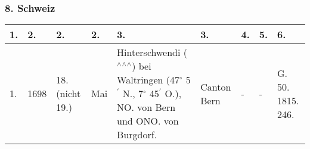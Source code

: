 \documentclass[a4paper, 8pt, oneside, polutonikogreek, german]{article}
\begin{document}
\clearpage
\begin{landscape}
\subsubsection{8. Schweiz}
\begin{table}[!ht]
    \centering
    \begin{tabular}{|l|l|l|l|l|l|l|l|l|}
    \hline
        1. & 2. & 2. & 2. & 3. & 3. & 4. & 5. & 6. \\ \hline
        1. & 1698 & 18. (nicht 19.) & Mai & Hinterschwendi ($^\wedge$$^\wedge$$^\wedge$) bei Waltringen (47$^\circ$ 5$^\prime$ N., 7$^\circ$ 45$^\prime$ O.), NO. von Bern und ONO. von Burgdorf. & Canton Bern & - & - & G. 50. 1815. 246. \\ \hline
    \end{tabular}
\end{table}
\end{landscape}
\clearpage
\end{document}
